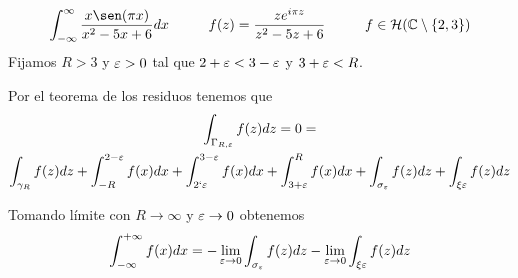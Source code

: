 \documentclass[12pt]{article}
\begin{document}
    \begin{ejercicio}
        \begin{gather*}
            \int_{-\infty}^\infty \frac{x\sen(\pi x)}{x^2-5x+6} dx \hspace{1cm} f(z) = \frac{z e^{i\pi z}}{z^2-5z+6}\hspace{1cm} f\in \cc{H}(\bb{C}\setminus \{2,3\})
        \end{gather*}
        Fijamos $R>3$ y $\varepsilon >0$ tal que $2+\varepsilon < 3-\varepsilon$ y $3+\varepsilon <R$.


        Por el teorema de los residuos tenemos que
        \begin{gather*}
            \int_{\Gamma_{R,\varepsilon}} f(z)dz = 0 = \\
            \int_{\gamma_R} f(z) dz + \int_{-R}^{2-\varepsilon} f(x) dx + \int_{2`\varepsilon}^{3-\varepsilon} f(x) dx + \int_{3+\varepsilon}^R f(x) dx + \int_{\sigma_\varepsilon}f(z) dz + \int_{\xi\varepsilon} f(z) dz
        \end{gather*}

        Tomando límite con $R\to \infty$ y $\varepsilon \to 0$ obtenemos 
        \begin{gather*}
            \int_{-\infty}^{+\infty} f(x) dx = -\lim\limits_{\varepsilon\to 0} \int_{\sigma_\varepsilon} f(z)dz - \lim\limits_{\varepsilon \to 0} \int_{\xi\varepsilon} f(z) dz 
        \end{gather*}


\end{ejercicio}
\end{document}
